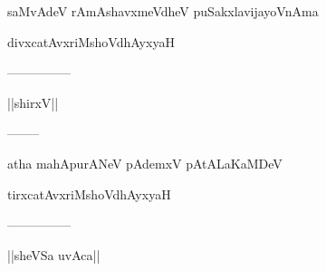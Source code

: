 \documentclass{article}
\begin{document}
\begin{center}
saMvAdeV rAmAshavxmeVdheV puSakxlavijayoVnAma
\end{center}

\begin{center}
divxcatAvxriMshoVdhAyxyaH
\end{center}

\begin{center}
---------------
\end{center}

\begin{center}
||shirxV||
\end{center}

\begin{center}
--------
\end{center}

\begin{center}
atha mahApurANeV pAdemxV pAtALaKaMDeV
\end{center}

\begin{center}
tirxcatAvxriMshoVdhAyxyaH
\end{center}

\begin{center}
---------------
\end{center}

\begin{center}
||sheVSa uvAca||
\end{center}
\end{document}
